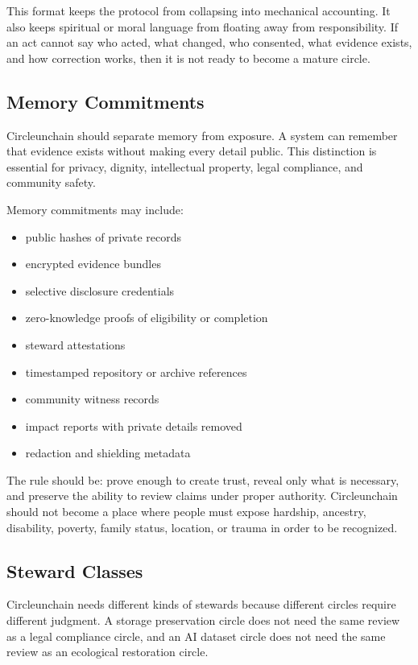 \documentclass[12pt]{article}
\begin{document}
This format keeps the protocol from collapsing into mechanical accounting. It also keeps spiritual or moral language from floating away from responsibility. If an act cannot say who acted, what changed, who consented, what evidence exists, and how correction works, then it is not ready to become a mature circle.

\subsection{Memory Commitments}

Circleunchain should separate memory from exposure. A system can remember that evidence exists without making every detail public. This distinction is essential for privacy, dignity, intellectual property, legal compliance, and community safety.

Memory commitments may include:

\begin{itemize}
  \item public hashes of private records
  \item encrypted evidence bundles
  \item selective disclosure credentials
  \item zero-knowledge proofs of eligibility or completion
  \item steward attestations
  \item timestamped repository or archive references
  \item community witness records
  \item impact reports with private details removed
  \item redaction and shielding metadata
\end{itemize}

The rule should be: prove enough to create trust, reveal only what is necessary, and preserve the ability to review claims under proper authority. Circleunchain should not become a place where people must expose hardship, ancestry, disability, poverty, family status, location, or trauma in order to be recognized.

\subsection{Steward Classes}

Circleunchain needs different kinds of stewards because different circles require different judgment. A storage preservation circle does not need the same review as a legal compliance circle, and an AI dataset circle does not need the same review as an ecological restoration circle.
\end{document}
